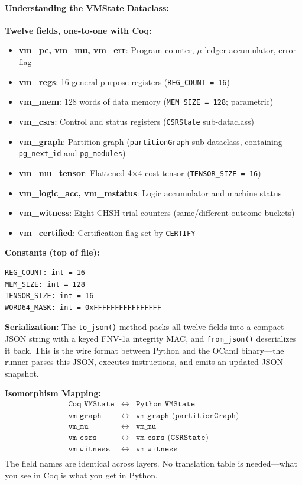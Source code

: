 \paragraph{Understanding the VMState Dataclass:}
\textbf{Twelve fields, one-to-one with Coq:}
\begin{itemize}
    \item \textbf{vm\_pc, vm\_mu, vm\_err}: Program counter, $\mu$-ledger accumulator, error flag
    \item \textbf{vm\_regs}: 16 general-purpose registers (\texttt{REG\_COUNT = 16})
    \item \textbf{vm\_mem}: $128$ words of data memory (\texttt{MEM\_SIZE = 128}; parametric)
    \item \textbf{vm\_csrs}: Control and status registers (\texttt{CSRState} sub-dataclass)
    \item \textbf{vm\_graph}: Partition graph (\texttt{partitionGraph} sub-dataclass, containing \texttt{pg\_next\_id} and \texttt{pg\_modules})
    \item \textbf{vm\_mu\_tensor}: Flattened 4$\times$4 cost tensor (\texttt{TENSOR\_SIZE = 16})
    \item \textbf{vm\_logic\_acc, vm\_mstatus}: Logic accumulator and machine status
    \item \textbf{vm\_witness}: Eight CHSH trial counters (same/different outcome buckets)
    \item \textbf{vm\_certified}: Certification flag set by \texttt{CERTIFY}
\end{itemize}

\textbf{Constants (top of file):}
\begin{lstlisting}
REG_COUNT: int = 16
MEM_SIZE: int = 128
TENSOR_SIZE: int = 16
WORD64_MASK: int = 0xFFFFFFFFFFFFFFFF
\end{lstlisting}

\textbf{Serialization:} The \texttt{to\_json()} method packs all twelve fields into a compact JSON string with a keyed FNV-1a integrity MAC, and \texttt{from\_json()} deserializes it back. This is the wire format between Python and the OCaml binary---the runner parses this JSON, executes instructions, and emits an updated JSON snapshot.

\textbf{Isomorphism Mapping:}
\[
\begin{array}{rcl}
\texttt{Coq VMState} & \longleftrightarrow & \texttt{Python VMState} \\
\texttt{vm\_graph} & \longleftrightarrow & \texttt{vm\_graph (partitionGraph)} \\
\texttt{vm\_mu} & \longleftrightarrow & \texttt{vm\_mu} \\
\texttt{vm\_csrs} & \longleftrightarrow & \texttt{vm\_csrs (CSRState)} \\
\texttt{vm\_witness} & \longleftrightarrow & \texttt{vm\_witness} \\
\end{array}
\]
The field names are identical across layers. No translation table is needed---what you see in Coq is what you get in Python.

